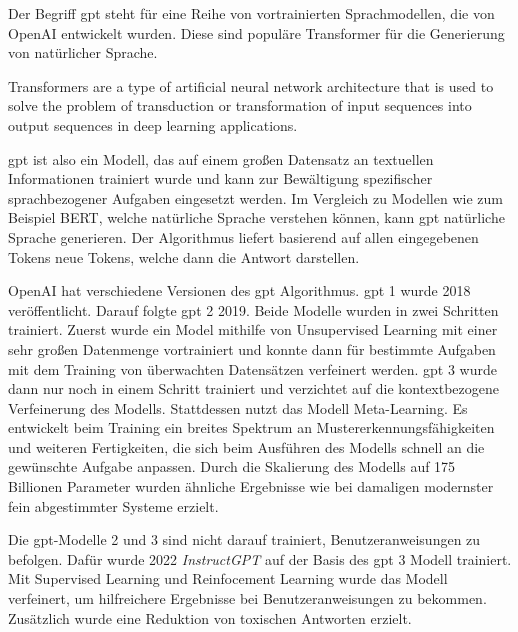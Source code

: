 Der Begriff \ac{gpt} steht für eine Reihe von vortrainierten Sprachmodellen, die von OpenAI entwickelt wurden. Diese sind populäre Transformer für die Generierung von natürlicher Sprache. \citep[vgl.][]{zhu_luo_2022}
\begin{definition}[Transformer]
	\label{def:transformer}
	\glqq Transformers are a type of artificial neural network architecture that is used to solve the problem of transduction or transformation of input sequences into output sequences in deep learning applications. \grqq{} \citep{Rogel-Salazar2022-pd}
\end{definition}
\ac{gpt} ist also ein Modell, das auf einem großen Datensatz an textuellen Informationen trainiert wurde und kann zur Bewältigung spezifischer sprachbezogener Aufgaben eingesetzt werden. Im Vergleich zu Modellen wie zum Beispiel BERT, welche natürliche Sprache verstehen können, kann \ac{gpt} natürliche Sprache generieren. Der Algorithmus liefert basierend auf allen eingegebenen Tokens neue Tokens, welche dann die Antwort darstellen. \citep[vgl.][]{zhu_luo_2022}

OpenAI hat verschiedene Versionen des \ac{gpt} Algorithmus. \ac{gpt} 1 wurde 2018 veröffentlicht. Darauf folgte \ac{gpt} 2 2019. Beide Modelle wurden in zwei Schritten trainiert. Zuerst wurde ein Model mithilfe von Unsupervised Learning mit einer sehr großen Datenmenge vortrainiert und konnte dann für bestimmte Aufgaben mit dem Training von überwachten Datensätzen verfeinert werden. \citep[vgl.][]{alec_2018} \ac{gpt} 3 wurde dann nur noch in einem Schritt trainiert und verzichtet auf die kontextbezogene Verfeinerung des Modells. \citep[vgl.][]{zhu_luo_2022} Stattdessen nutzt das Modell \glqq Meta-Learning\grqq{}. Es entwickelt beim Training ein breites Spektrum an Mustererkennungsfähigkeiten und weiteren Fertigkeiten, die sich beim Ausführen des Modells schnell an die gewünschte Aufgabe anpassen. Durch die Skalierung des Modells auf 175 Billionen Parameter wurden ähnliche Ergebnisse wie bei damaligen modernster fein abgestimmter Systeme erzielt. \citep[vgl.][]{brown2020language} 

Die \ac{gpt}-Modelle 2 und 3 sind nicht darauf trainiert, Benutzeranweisungen zu befolgen. Dafür wurde 2022 \textit{InstructGPT} auf der Basis des \ac{gpt} 3 Modell trainiert. Mit Supervised Learning und Reinfocement Learning wurde das Modell verfeinert, um hilfreichere Ergebnisse bei Benutzeranweisungen zu bekommen. Zusätzlich wurde eine Reduktion von toxischen Antworten erzielt. \citep[vgl.][]{ouyang2022training}

